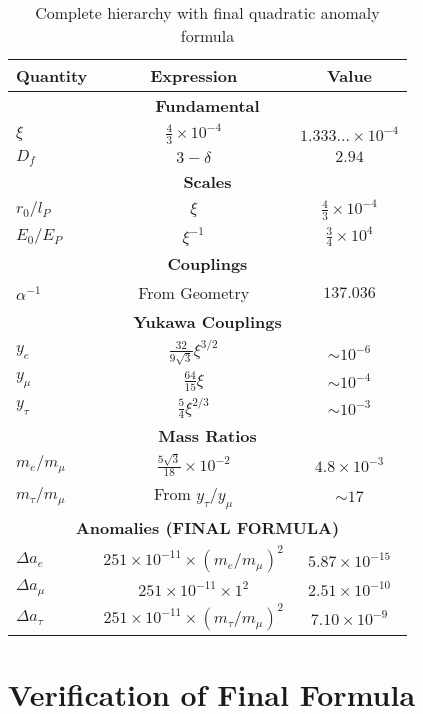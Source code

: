 \documentclass[12pt,a4paper]{article}
\newcommand{\lP}{l_P}
\newcommand{\EP}{E_P}
\newcommand{\rzero}{r_0}
\newcommand{\Ezero}{E_0}
\newcommand{\xipar}{\xi}
\begin{document}
	\begin{table}[h]
		\centering
		\begin{tabular}{lcc}
			\toprule
			\textbf{Quantity} & \textbf{Expression} & \textbf{Value} \\
			\midrule
			\multicolumn{3}{c}{\textbf{Fundamental}} \\
			$\xipar$ & $\frac{4}{3} \times 10^{-4}$ & $1.333\ldots \times 10^{-4}$ \\
			$D_f$ & $3 - \delta$ & $2.94$ \\
			\midrule
			\multicolumn{3}{c}{\textbf{Scales}} \\
			$\rzero/\lP$ & $\xipar$ & $\frac{4}{3} \times 10^{-4}$ \\
			$\Ezero/\EP$ & $\xipar^{-1}$ & $\frac{3}{4} \times 10^{4}$ \\
			\midrule
			\multicolumn{3}{c}{\textbf{Couplings}} \\
			$\alpha^{-1}$ & From Geometry & $137.036$ \\
			\midrule
			\multicolumn{3}{c}{\textbf{Yukawa Couplings}} \\
			$y_e$ & $\frac{32}{9\sqrt{3}} \xipar^{3/2}$ & $\sim 10^{-6}$ \\
			$y_\mu$ & $\frac{64}{15} \xipar$ & $\sim 10^{-4}$ \\
			$y_\tau$ & $\frac{5}{4} \xipar^{2/3}$ & $\sim 10^{-3}$ \\
			\midrule
			\multicolumn{3}{c}{\textbf{Mass Ratios}} \\
			$m_e/m_\mu$ & $\frac{5 \sqrt{3}}{18} \times 10^{-2}$ & $4.8 \times 10^{-3}$ \\
			$m_\tau/m_\mu$ & From $y_\tau/y_\mu$ & $\sim 17$ \\
			\midrule
			\multicolumn{3}{c}{\textbf{Anomalies (FINAL FORMULA)}} \\
			$\Delta a_e$ & $251 \times 10^{-11} \times (m_e/m_\mu)^2$ & $5.87 \times 10^{-15}$ \\
			$\Delta a_\mu$ & $251 \times 10^{-11} \times 1^2$ & $2.51 \times 10^{-10}$ \\
			$\Delta a_\tau$ & $251 \times 10^{-11} \times (m_\tau/m_\mu)^2$ & $7.10 \times 10^{-9}$ \\
			\bottomrule
		\end{tabular}
		\caption{Complete hierarchy with final quadratic anomaly formula}
	\end{table}
	
	\section{Verification of Final Formula}
	
\end{document}
